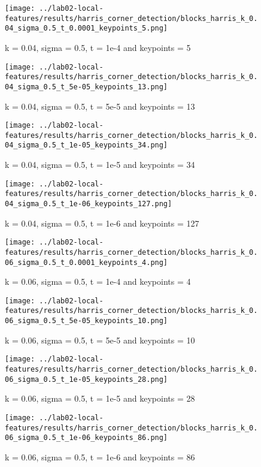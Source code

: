 \documentclass{ETHExercise}
\begin{document}
\begin{figure}[!h]
  \texttt{[image: ../lab02-local-features/results/harris\_corner\_detection/blocks\_harris\_k\_0.04\_sigma\_0.5\_t\_0.0001\_keypoints\_5.png]}
  \caption{k = 0.04, sigma = 0.5, t = 1e-4 and keypoints = 5}
\endminipage\hfill
{}
  \texttt{[image: ../lab02-local-features/results/harris\_corner\_detection/blocks\_harris\_k\_0.04\_sigma\_0.5\_t\_5e-05\_keypoints\_13.png]}
  \caption{k = 0.04, sigma = 0.5, t = 5e-5 and keypoints = 13}
\endminipage\hfill
{}%
  \texttt{[image: ../lab02-local-features/results/harris\_corner\_detection/blocks\_harris\_k\_0.04\_sigma\_0.5\_t\_1e-05\_keypoints\_34.png]}
  \caption{k = 0.04, sigma = 0.5, t = 1e-5 and keypoints = 34}
\endminipage\hfill
{}%
  \texttt{[image: ../lab02-local-features/results/harris\_corner\_detection/blocks\_harris\_k\_0.04\_sigma\_0.5\_t\_1e-06\_keypoints\_127.png]}
  \caption{k = 0.04, sigma = 0.5, t = 1e-6 and keypoints = 127}
\endminipage
\end{figure}
\begin{figure}[!h]
    \texttt{[image: ../lab02-local-features/results/harris\_corner\_detection/blocks\_harris\_k\_0.06\_sigma\_0.5\_t\_0.0001\_keypoints\_4.png]}
    \caption{k = 0.06, sigma = 0.5, t = 1e-4 and keypoints = 4}
  \endminipage\hfill
    \texttt{[image: ../lab02-local-features/results/harris\_corner\_detection/blocks\_harris\_k\_0.06\_sigma\_0.5\_t\_5e-05\_keypoints\_10.png]}
    \caption{k = 0.06, sigma = 0.5, t = 5e-5 and keypoints = 10}
  \endminipage\hfill
    \texttt{[image: ../lab02-local-features/results/harris\_corner\_detection/blocks\_harris\_k\_0.06\_sigma\_0.5\_t\_1e-05\_keypoints\_28.png]}
    \caption{k = 0.06, sigma = 0.5, t = 1e-5 and keypoints = 28}
  \endminipage\hfill
    \texttt{[image: ../lab02-local-features/results/harris\_corner\_detection/blocks\_harris\_k\_0.06\_sigma\_0.5\_t\_1e-06\_keypoints\_86.png]}
    \caption{k = 0.06, sigma = 0.5, t = 1e-6 and keypoints = 86}
  \endminipage
\end{figure}
\end{document}
